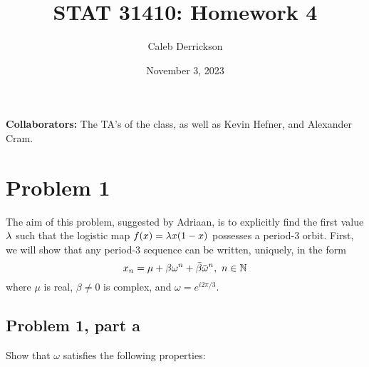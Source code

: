 

\title{STAT 31410: Homework 4}
\author{Caleb Derrickson}
\date{November 3, 2023}


\onehalfspacing
\maketitle
\allowdisplaybreaks
{\color{cit}\vspace{2mm}\noindent\textbf{Collaborators:}} The TA's of the class, as well as Kevin Hefner, and Alexander Cram.

\tableofcontents

\newpage
\section{Problem 1}
The aim of this problem, suggested by Adriaan, is to explicitly find the first value $\lambda$ such that the logistic map $f(x) = \lambda x(1 - x)$ possesses a period-3 orbit. First, we will show that any period-3 sequence can be written, uniquely, in the form
\[
x_n = \mu + \beta \omega^n + \Bar{\beta}\Bar{\omega}^n, \ n \in \mathbb{N}
\]
where $\mu$ is real, $\beta \neq 0$ is complex, and $\omega = e^{i2\pi / 3}$.
\subsection{Problem 1, part a}
Show that $\omega$ satisfies the following properties:


